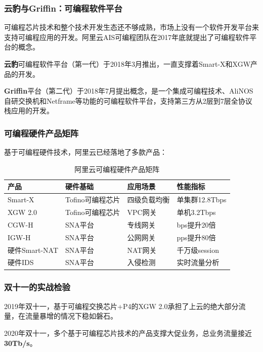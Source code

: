 \subsubsection{云豹与Griffin：可编程软件平台}

可编程芯片技术和整个技术开发生态还不够成熟，市场上没有一个软件开发平台来支持可编程应用的开发。阿里云AIS可编程团队在2017年底就提出了可编程软件平台的概念。

\textbf{云豹}可编程软件平台（第一代）于2018年3月推出，一直支撑着Smart-X和XGW产品的开发。

\textbf{Griffin}平台（第二代）于2018年7月提出概念，是一个集成可编程技术、AliNOS自研交换机和Netframe等功能的可编程软件平台，支持第三方从2层到7层全协议栈应用的开发。

\subsubsection{可编程硬件产品矩阵}

基于可编程硬件技术，阿里云已经落地了多款产品：

\begin{table}[htbp]
\centering
\caption{阿里云可编程硬件产品矩阵}
\begin{tabular}{|l|l|l|l|}
\hline
\textbf{产品} & \textbf{硬件基础} & \textbf{应用场景} & \textbf{性能指标} \\
\hline
Smart-X & Tofino可编程芯片 & 四级负载均衡 & 单集群12.8Tbps \\
\hline
XGW 2.0 & Tofino可编程芯片 & VPC网关 & 单机3.2Tbps \\
\hline
CGW-H & SNA平台 & 专线网关 & bps提升20倍 \\
\hline
IGW-H & SNA平台 & 公网网关 & pps提升80倍 \\
\hline
硬件Smart-NAT & SNA平台 & NAT网关 & 千万级session \\
\hline
硬件IDS & SNA平台 & 入侵检测 & 实时流量分析 \\
\hline
\end{tabular}
\end{table}

\subsubsection{双十一的实战检验}

2019年双十一，基于可编程交换芯片+P4的XGW 2.0承担了上云的绝大部分流量，在流量暴增的情况下稳如磐石。

2020年双十一，多个基于可编程芯片技术的产品支撑大促业务，总业务流量接近\textbf{30Tb/s}。

